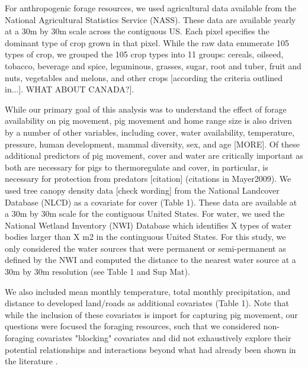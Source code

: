 \documentclass[a4paper]{article}
\begin{document}

For anthropogenic forage resources, we used agricultural data available from the National Agricultural Statistics Service (NASS). These data are available yearly at a 30m by 30m scale across the contiguous US. Each pixel specifies the dominant type of crop grown in that pixel.  While the raw data enumerate 105 types of crop, we grouped the 105 crop types into 11 groups: cereals, oilseed, tobacco, beverage and spice, leguminous, grasses, sugar, root and tuber, fruit and nuts, vegetables and melons, and other crops [according the criteria outlined in...]. WHAT ABOUT CANADA?]. 

While our primary goal of this analysis was to understand the effect of forage availability on pig movement, pig movement and home range size is also driven by a number of other variables, including cover, water availability, temperature, pressure, human development, mammal diversity, sex, and age \citep{McClure2015,Garza2017,Kay2017} [MORE].  Of these additional predictors of pig movement, cover and water are critically important as both are necessary for pigs to thermoregulate \citep{Choquenot1996a} and cover, in particular, is necessary for protection from predators [citation] (citations in Mayer2009). We used tree canopy density data [check wording] from the National Landcover Database (NLCD) as a covariate for cover (Table 1). These data are available at a 30m by 30m scale for the contiguous United States. For water, we used the National Wetland Inventory (NWI) Database which identifies X types of water bodies larger than X m2 in the continguous United States. For this study, we only considered the water sources that were permanent or semi-permanent as defined by the NWI and computed the distance to the nearest water source at a 30m by 30m resolution (see Table 1 and Sup Mat). 

We also included mean monthly temperature, total monthly precipitation, and distance to developed land/roads as additional covariates (Table 1). Note that while the inclusion of these covariates is import for capturing pig movement, our questions were focused the foraging resources, such that we considered non-foraging covariates "blocking" covariates and did not exhaustively explore their potential relationships and interactions beyond what had already been shown in the literature \citep[e.g.][]{Kay2017}.  
\end{document}
